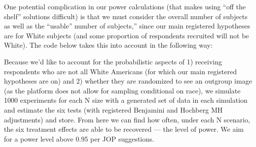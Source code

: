 \documentclass[
]{article}
\begin{document}
One potential complication in our power calculations (that makes using
``off the shelf'' solutions difficult) is that we must consider the
overall number of subjects as well as the ``usable'' number of
subjects,'' since our main registered hypotheses are for White subjects
(and some proportion of respondents recruited will not be White). The
code below takes this into account in the following way:

Because we'd like to account for the probabilistic aspects of 1)
receiving respondents who are not all White Americans (for which our
main registered hypotheses are on) and 2) whether they are randomized to
see an outgroup image (as the platform does not allow for sampling
conditional on race), we simulate 1000 experiments for each N size with
a generated set of data in each simulation and estimate the six tests
(with registered Benjamini and Hochberg MH adjustments) and store. From
here we can find how often, under each N scenario, the six treatment
effects are able to be recovered --- the level of power. We aim for a
power level above 0.95 per JOP suggestions.
\end{document}
